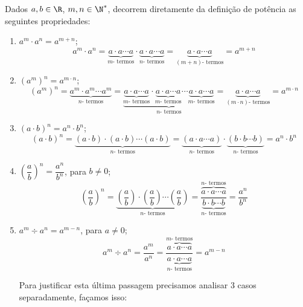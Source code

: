   Dados $a, b \in \R$, $m, n \in \N^{*}$, decorrem diretamente da definição de potência as seguintes propriedades:
 \begin{enumerate}[P1)]
 \item $a^m \cdot a^n= a^{m + n}$;
\begin{equation}
a^m \cdot a^n = \underbrace{a \cdot a \cdots a}_{m \text{- termos}}\cdot \underbrace{a \cdot a \cdots a}_{n \text{- termos}}= \underbrace{a \cdot a \cdots a}_{(m+n) \text{- termos}}= a^{m + n} 
\end{equation}

 \item $(a^m)^n= a^{m \cdot n}$;
\begin{equation}
(a^m)^n= \underbrace{a^m \cdot a^m \cdots a^m}_{n \text{- termos}}= \underbrace{\underbrace{a \cdot a \cdots a}_{m \text{- termos}} \cdot \underbrace{a \cdot a \cdots a}_{m \text{- termos}} \cdots \underbrace{a \cdot a \cdots a}_{m \text{- termos}}}_{n \text{- termos}}= \underbrace{a \cdot a \cdots a}_{(m \cdot n) \text{- termos}}= a^{m \cdot n}
\end{equation}

 \item $(a \cdot b)^n= a^n \cdot b^n$;
\begin{equation}
(a \cdot b)^n= \underbrace{(a \cdot b) \cdot (a\cdot b) \cdots (a \cdot b)}_{n \text{- termos}}= \underbrace{(a \cdot a \cdots a)}_{n \text{- termos}} \cdot \underbrace{(b \cdot b \cdots b)}_{n \text{- termos}}= a^n \cdot b^n
\end{equation}

 \item $\left(\dfrac{a}{b}\right)^n= \dfrac{a^n}{b^n}$, para $b \neq 0$;
 \[\left(\dfrac{a}{b}\right)^n=
 \underbrace{\left(\dfrac{a}{b}\right) \cdot \left(\dfrac{a}{b}\right) \cdots \left(\dfrac{a}{b}\right)}_{n \text{- termos}}= \dfrac{\overbrace{a \cdot a \cdots a}^{n \text{- termos}}}{\underbrace{b \cdot b \cdots b}_{n \text{- termos}}}= \dfrac{a^n}{b^n}\]

 \item $a^m \div a^n= a^{m - n}$, para $a \neq 0$;
\begin{equation}
a^m \div a^n= \dfrac{a^m}{a^n}= \dfrac{\overbrace{a \cdot a \cdots a}^{m \text{- termos}}}{\underbrace{a \cdot a \cdots a}_{n \text{- termos}}} = a^{m - n}
\end{equation}

 Para justificar esta última passagem precisamos analisar 3 casos separadamente, façamos isso:


\end{enumerate}
